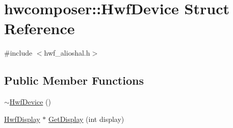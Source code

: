 \hypertarget{structhwcomposer_1_1HwfDevice}{}\section{hwcomposer\+:\+:Hwf\+Device Struct Reference}
\label{structhwcomposer_1_1HwfDevice}


{\ttfamily \#include $<$hwf\+\_\+alioshal.\+h$>$}

\subsection*{Public Member Functions}
\begin{DoxyCompactItemize}
\item 
\mbox{\hyperlink{structhwcomposer_1_1HwfDevice_a027a1b50b40fbab4398e755956cfa416}{$\sim$\+Hwf\+Device}} ()
\item 
\mbox{\hyperlink{structhwcomposer_1_1HwfDisplay}{Hwf\+Display}} $\ast$ \mbox{\hyperlink{structhwcomposer_1_1HwfDevice_a1c88092007418ad866571a31cba36675}{Get\+Display}} (int display)
\end{DoxyCompactItemize}
